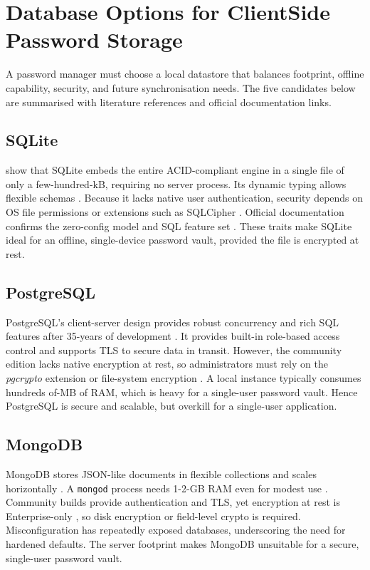 \section{Database Options for Client\textendash Side Password Storage}
\label{sec:database-selection}

A password manager must choose a local datastore that balances footprint,
offline capability, security, and future synchronisation needs.  The five
candidates below are summarised with literature references and official
documentation links.

\subsection*{SQLite}
\textcite{Gaffney2022} show that SQLite embeds the entire ACID-compliant
engine in a single file of only a few-hundred-kB, requiring no server
process.  Its dynamic typing allows flexible schemas \autocite{Corovcak2025}.
Because it lacks native user authentication, security depends on OS file
permissions or extensions such as SQLCipher \autocite{Corovcak2025}.
Official documentation confirms the zero-config model and SQL feature set
\autocite{sqlLiteDoc2025}. These traits make SQLite ideal for an offline,
single-device password vault, provided the file is encrypted at rest.

\subsection*{PostgreSQL}
PostgreSQL's client-server design provides robust concurrency and rich SQL
features after 35-years of development \autocite{Gkamas2022}. It provides 
built-in role-based access control and supports TLS to secure data in transit.
However, the community edition lacks native encryption at rest, so administrators 
must rely on the \textit{pgcrypto} extension or file-system encryption 
\autocite{Crunchy2024, PostgreSQL2025}. A local instance typically consumes hundreds of-MB of RAM,
which is heavy for a single-user password vault. Hence PostgreSQL is secure and scalable,
but overkill for a single-user application.

\subsection*{MongoDB}
MongoDB stores JSON-like documents in flexible collections and scales
horizontally \autocite{Miryala2024}.  A \texttt{mongod} process needs 1-2-GB
RAM even for modest use \autocite{Dahunsi2021}.  Community builds provide
authentication and TLS, yet encryption at rest is Enterprise-only
\autocite{PrismaMongoEnc, MongoDB2025}, so disk encryption or field-level
crypto is required.  Misconfiguration has repeatedly exposed databases,
underscoring the need for hardened defaults.  The
server footprint makes MongoDB unsuitable for a secure, single-user password vault.

